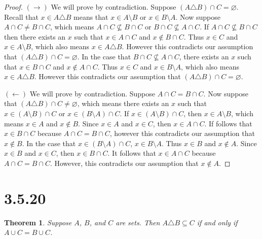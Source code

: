 \documentclass{article}
\newtheorem*{theorem}{Theorem}  %
\begin{document}
\begin{proof}
$(\rightarrow)$ We will prove by contradiction. Suppose $(A \triangle B) \cap C = \varnothing$. Recall that $x \in A \triangle B$ means that $x \in A \setminus B$ or $x \in B \setminus A$. Now suppose $A \cap C \neq B \cap C$, which means $A \cap C \not\subseteq B \cap C$ or $B \cap C \not\subseteq A \cap C$. If $A \cap C \not\subseteq B \cap C$ then there exists an $x$ such that $x \in A \cap C$ and $x \notin B \cap C$. Thus $x \in C$ and $x \in A \setminus B$, which also means $x \in A \triangle B$. However this contradicts our assumption that $(A \triangle B) \cap C = \varnothing$. In the case that $B \cap C \not\subseteq A \cap C$, there exists an $x$ such that $x \in B \cap C$ and $x \notin A \cap C$. Thus $x \in C$ and $x \in B \setminus A$, which also means $x \in A \triangle B$. However this contradicts our assumption that $(A \triangle B) \cap C = \varnothing$.

$(\leftarrow)$ We will prove by contradiction. Suppose $A \cap C = B \cap C$. Now suppose that $(A \triangle B) \cap C \neq \varnothing$, which means there exists an $x$ such that $x \in (A \setminus B) \cap C$ or $x \in (B \setminus A) \cap C$. If $ x \in (A \setminus B) \cap C$, then $x \in A \setminus B$, which means $x \in A$ and $x \notin B$. Since $x \in A$ and $x \in C$, then $x \in A \cap C$. If follows that $x \in B \cap C$ because $A \cap C = B \cap C$, however this contradicts our assumption that $x \notin B$. In the case that $x \in (B \setminus A) \cap C$, $x \in B \setminus A$. Thus $x \in B$ and $x \notin A$. Since $x \in B$ and $x \in C$, then $x \in B \cap C$. It follows that $x \in A \cap C$ because $A \cap C = B \cap C$. However, this contradicts our assumption that $x \notin A$. 
\end{proof}

\section*{3.5.20}
\begin{theorem} Suppose $A$, $B$, and $C$ are sets. Then $A \triangle B \subseteq C$ if and only if $A \cup C = B \cup C$.
\end{theorem}
\end{document}
